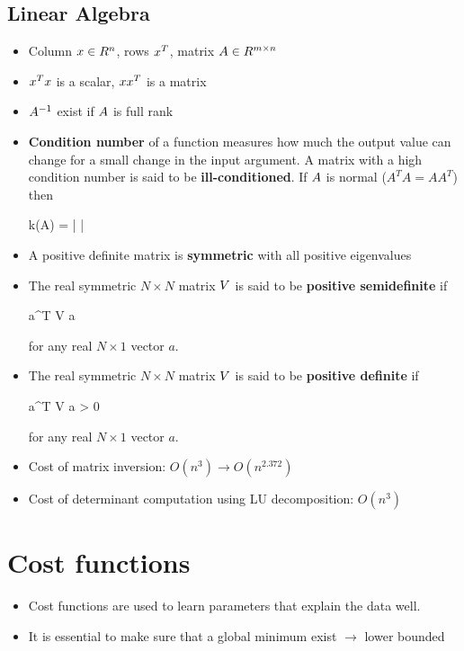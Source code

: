 \subsection{Linear Algebra}
\begin{itemize}
\item Column $\*x \in R^n$, rows $\*x^T$, matrix $\*A \in R^{m \times n}$

\item $\*x^T \*x$ is a scalar, $\*x \*x^T$ is a matrix

\item $\*A^{-1}$ exist if $\*A$ is full rank

\item \textbf{Condition number} of a function measures how much the output value can change for a small change in the input argument. A matrix with a high condition number is said to be \textbf{ill-conditioned}. If $\*A$ is normal ($A^T A = A A^T$) then
\begin{myalign*}
    k(\*A) = 
    \left|
    \right|
\end{myalign*}

\item A positive definite matrix is \textbf{symmetric} with all positive eigenvalues
\item The real symmetric $N \times N$ matrix $\*V$ is said to be \textbf{positive semidefinite} if 
\begin{myalign*}
    \*a^T \*V \*a 
\end{myalign*}
for any real $N \times 1$ vector $a$.
\item The real symmetric $N \times N$ matrix $\*V$ is said to be \textbf{positive definite} if 
\begin{myalign*}
    \*a^T \*V \*a > 0
\end{myalign*}
for any real $N \times 1$ vector $a$.
\item Cost of matrix inversion: $O(n^3) \rightarrow O(n^{2.372})$
\item Cost of determinant computation using LU decomposition: $O(n^3)$

\end{itemize}


\section{Cost functions}
\begin{itemize}
    \item Cost functions are used to learn parameters that explain the data well.
    \item It is essential to make sure that a global minimum exist $\rightarrow$ lower bounded
\end{itemize}


